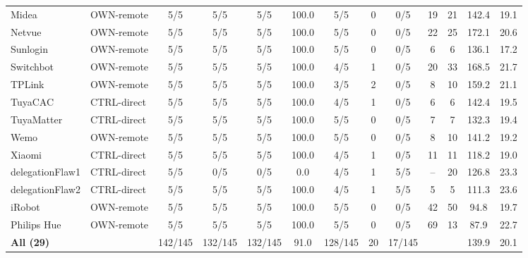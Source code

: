 \begin{table}[t]
\begin{tabular*}{\linewidth}{@{\extracolsep{\fill}} ll ccccc ccc cc @{}}
Midea & OWN-remote & 5/5 & 5/5 & 5/5 & 100.0 & 5/5 & 0 & 0/5 & 19 & 21 & 142.4 & 19.1 \\
Netvue & OWN-remote & 5/5 & 5/5 & 5/5 & 100.0 & 5/5 & 0 & 0/5 & 22 & 25 & 172.1 & 20.6 \\
Sunlogin & OWN-remote & 5/5 & 5/5 & 5/5 & 100.0 & 5/5 & 0 & 0/5 & 6 & 6 & 136.1 & 17.2 \\
Switchbot & OWN-remote & 5/5 & 5/5 & 5/5 & 100.0 & 4/5 & 1 & 0/5 & 20 & 33 & 168.5 & 21.7 \\
TPLink & OWN-remote & 5/5 & 5/5 & 5/5 & 100.0 & 3/5 & 2 & 0/5 & 8 & 10 & 159.2 & 21.1 \\
TuyaCAC & CTRL-direct & 5/5 & 5/5 & 5/5 & 100.0 & 4/5 & 1 & 0/5 & 6 & 6 & 142.4 & 19.5 \\
TuyaMatter & CTRL-direct & 5/5 & 5/5 & 5/5 & 100.0 & 5/5 & 0 & 0/5 & 7 & 7 & 132.3 & 19.4 \\
Wemo & OWN-remote & 5/5 & 5/5 & 5/5 & 100.0 & 5/5 & 0 & 0/5 & 8 & 10 & 141.2 & 19.2 \\
Xiaomi & CTRL-direct & 5/5 & 5/5 & 5/5 & 100.0 & 4/5 & 1 & 0/5 & 11 & 11 & 118.2 & 19.0 \\
delegationFlaw1 & CTRL-direct & 5/5 & 0/5 & 0/5 & 0.0 & 4/5 & 1 & 5/5 & -- & 20 & 126.8 & 23.3 \\
delegationFlaw2 & CTRL-direct & 5/5 & 5/5 & 5/5 & 100.0 & 4/5 & 1 & 5/5 & 5 & 5 & 111.3 & 23.6 \\
iRobot & OWN-remote & 5/5 & 5/5 & 5/5 & 100.0 & 5/5 & 0 & 0/5 & 42 & 50 & 94.8 & 19.7 \\
Philips Hue & OWN-remote & 5/5 & 5/5 & 5/5 & 100.0 & 5/5 & 0 & 0/5 & 69 & 13 & 87.9 & 22.7 \\
\hline
\textbf{All (29)} &  & 142/145 & 132/145 & 132/145 & 91.0 & 128/145 & 20 & 17/145 &  &  & 139.9 & 20.1 \\
\hline\hline
\end{tabular*}
\end{table}
